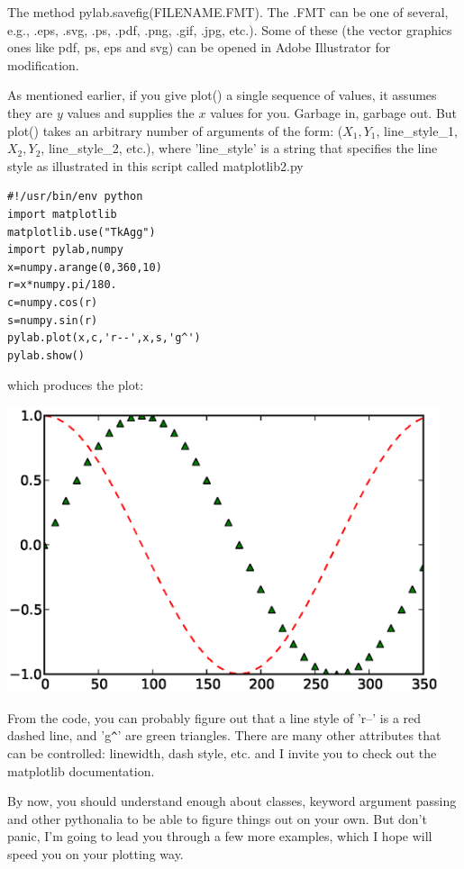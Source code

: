 \documentclass[11pt]{book}
\begin{document}
{\noindent The method {\color{blue}pylab.savefig(FILENAME.FMT)}.  The .FMT can be one of several, e.g., .eps, .svg, .ps, .pdf, .png, .gif, .jpg, etc.).   Some of these (the vector graphics ones like pdf,  ps, eps and svg) can be opened in Adobe Illustrator for modification.   


As mentioned earlier, if  you give {\color{blue}plot()} a single sequence of values, it assumes they are $y$ values and supplies the $x$ values for you.  Garbage in, garbage out.  But 
 {\color{blue}plot()} takes an arbitrary number of arguments of the form: ($X_1, Y_1$, line\_style\_1, $X_2, Y_2$, line\_style\_2,  etc.), 
 where 'line\_style' is a string that specifies the line style as illustrated in this script called {\color{blue}matplotlib2.py}


{ \color{blue} \begin{verbatim}
#!/usr/bin/env python
import matplotlib
matplotlib.use("TkAgg")
import pylab,numpy
x=numpy.arange(0,360,10)
r=x*numpy.pi/180.
c=numpy.cos(r)
s=numpy.sin(r)
pylab.plot(x,c,'r--',x,s,'g^')
pylab.show()
\end{verbatim}}

\noindent which produces the plot: 

\includegraphics[width=5in]{EPSfiles/matplotlib2.eps}

\noindent   From the code, you can probably figure out that a line style of 'r--' is a red dashed line,  and 'g\verb|^|'  are green triangles.  
There are many other attributes that can be controlled: linewidth, dash style, etc. and I invite you to check out the {\color{blue}matplotlib} documentation.

\noindent By now, you should understand enough about classes, keyword argument passing and other pythonalia to be able to figure things out on your own.   But don't panic, I'm going to lead you through a few more examples, which I hope will speed you on your plotting way.  



}
\end{document}
